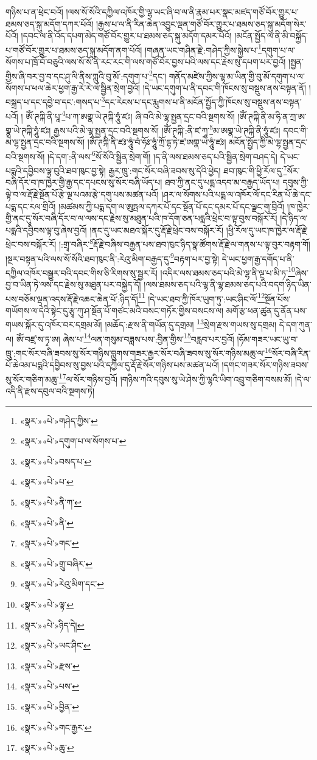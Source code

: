 གཉིས་པ་ན་ཕྲེང་བའོ། །ལས་སོ་སོའི་དཀྱིལ་འཁོར་གྱི་ལྷ་ཡང་ཞི་བ་ལ་ནི་རྣམ་པར་སྣང་མཛད་གཙོ་བོར་གྱུར་པ་ཐམས་ཅད་སྐུ་མདོག་དཀར་པོའོ། །རྒྱས་པ་ལ་ནི་རིན་ཆེན་འབྱུང་ལྡན་གཙོ་བོར་གྱུར་པ་ཐམས་ཅད་སྐུ་མདོག་སེར་པོའོ། །དབང་ལ་ནི་འོད་དཔག་མེད་གཙོ་བོར་གྱུར་པ་ཐམས་ཅད་སྐུ་མདོག་དམར་པོའོ། །མངོན་སྤྱོད་ལ་ནི་མི་བསྐྱོད་པ་གཙོ་བོར་གྱུར་པ་ཐམས་ཅད་སྐུ་མདོག་ནག་པོའོ། །གཞན་ཡང་གཤིན་རྗེ་:གཤེད་ཀྱིས་སྐྱེས་པ་\footnote{«སྣར་»«པེ་»གཤེད་ཀྱིས་}དགུག་པ་ལ་སོགས་པ་ཁྲོ་བོ་བཅུའི་ལས་སོ་སོ་ནི་རང་རང་གི་ལས་གཙོ་བོར་བྱས་པའི་ལས་དང་རྗེས་སུ་དཔག་པར་བྱའོ། །སྤྱན་གྱིས་ཞི་བར་བྱ་བ་དང་ཤུ་ལི་ནིས་ཀླུའི་བུ་མོ་:དགུག་པ་\footnote{«སྣར་»«པེ་»དགུག་པ་ལ་སོགས་པ་}དང་། གནོད་མཛེས་ཀྱིས་ལྷ་མ་ཡིན་གྱི་བུ་མོ་དགུག་པ་ལ་སོགས་པ་ཕལ་ཆེར་ཕྱག་རྒྱ་རེ་རེ་ལ་སྦྱིན་སྲེག་བྱའོ། །དེ་ཡང་དགུག་པ་ནི་དབང་གི་ཁོངས་སུ་བསྡུས་ནས་བསྟན་ནོ། །བསྐྲད་པ་དང་དབྱེ་བ་དང་:གསད་པ་\footnote{«སྣར་»«པེ་»བསད་པ་}དང་རེངས་པ་དང་རྨུགས་པ་ནི་མངོན་སྤྱོད་ཀྱི་ཁོངས་སུ་བསྡུས་ནས་བསྟན་པའོ། །
ཨོཾ་ཊཀྐི་ནི་པཱ་\footnote{«སྣར་»«པེ་»པ་}པ་ཀ་ཨགྣ་ཡེ་ཊཀྐི་ཧཱུཾ་ཛཿ། ཞི་བའི་མེ་ལྷ་སྤྱན་དྲང་བའི་སྔགས་སོ། །ཨོཾ་ཊཀྐི་ནི་མ་ཧི་ན་ཀྲ་ཨ་གྣ་ཡེ་ཊཀྐི་ཧཱུཾ་ཛཿ། རྒྱས་པའི་མེ་ལྷ་སྤྱན་དྲང་བའི་སྔགས་སོ། །ཨོཾ་ཊཀྐི་:ནི་ཛ་ཀཱ་\footnote{«སྣར་»«པེ་»ནི་ཀ་}མ་ཨགྣ་ཡེ་ཊཀྐི་ནི་ཧཱུཾ་ཛཿ། དབང་གི་མེ་ལྷ་སྤྱན་དྲང་བའི་སྔགས་སོ། །ཨོཾ་ཊཀྐི་ནི་ཛཿ་ཧཱུཾ་བཾ་ཧོཿ་ཧཱུཾ་ཀྲོ་དྷ་ཏེ་ཛ་ཨགྣ་ཡེ་ཧཱུཾ་ཛཿ། མངོན་སྤྱོད་ཀྱི་མེ་ལྷ་སྤྱན་དྲང་བའི་སྔགས་སོ། །དེ་དག་:ནི་ལས་\footnote{«སྣར་»«པེ་»ནི་}སོ་སོའི་སྦྱིན་སྲེག་གོ། །ད་ནི་ལས་ཐམས་ཅད་པའི་སྦྱིན་སྲེག་བཤད་དེ། དེ་ཡང་པདྨའི་དབྱིབས་ལྟ་བུའི་ཐབ་ཁུང་བྱ་སྟེ། རྒྱར་ཁྲུ་:གང་སོར་བཞི་ཟབས་སུ་དེའི་ཕྱེད། ཐབ་ཁུང་གི་ཕྱི་རོལ་དུ་\footnote{«སྣར་»«པེ་»གང་}སོར་བཞི་དོར་བ་ཁ་ཁྱེར་གྱི་རྒྱ་དང་དཔངས་སུ་སོར་བཞི་ཡོད་པ། ཐབ་ཀྱི་ནང་དུ་པདྨ་འདབ་མ་བརྒྱད་ཡོད་པ། དབུས་ཀྱི་ལྟེ་བ་ལ་རྡོ་རྗེ་སྔོན་པོ་རྩེ་ལྔ་པའམ་རྩེ་དགུ་པས་མཚན་པའོ། །ཤར་ལ་སོགས་པའི་པདྨ་ལ་འཁོར་ལོ་དང་རིན་པོ་ཆེ་དང་པདྨ་དང་རལ་གྲིའོ། །མཚམས་ཀྱི་པདྨ་དག་ལ་ཨུཏྤལ་དཀར་པོ་དང་སྔོན་པོ་དང་དམར་པོ་དང་ལྗང་གུ་བྲིའོ། །ཁ་ཁྱེར་གྱི་ནང་དུ་སོར་བཞི་དོར་བ་ལ་ལས་དང་རྗེས་སུ་མཐུན་པའི་ཁ་དོག་ཅན་པདྨའི་ཕྲེང་བ་ལྟ་བུས་བསྐོར་རོ། །དེ་ཉིད་ལ་པདྨའི་དབྱིབས་ལྟ་བུ་ཞེས་བྱའོ། །ནང་དུ་ཡང་མཐའ་སྐོར་དུ་རྡོ་རྗེ་ཕྲེང་བས་བསྐོར་རོ། །ཕྱི་རོལ་དུ་ཡང་ཁ་ཁྱེར་ལ་རྡོ་རྗེ་ཕྲེང་བས་བསྐོར་རོ། །:གྲྭ་བཞིར་\footnote{«སྣར་»«པེ་»གྲུ་བཞིར་}རྡོ་རྗེ་བཞིས་བརྒྱན་པས་ཐབ་ཁུང་ཉིད་སྣ་ཚོགས་རྡོ་རྗེ་ལ་གནས་པ་ལྟ་བུར་བརྟག་གོ། །སྔར་བསྟན་པའི་ལས་སོ་སོའི་ཐབ་ཁུང་ནི་:རེའུ་མིག་བརྒྱད་དུ་\footnote{«སྣར་»«པེ་»རེའུ་མིག་དང་}བརྟག་པར་བྱ་སྟེ། དེ་ཡང་ཕྱག་རྒྱ་དགོད་པ་ནི་དཀྱིལ་འཁོར་བསྒྱུར་བའི་དབང་གིས་ཅི་རིགས་སུ་སྦྱར་རོ། །འདིར་ལས་ཐམས་ཅད་པའི་མེ་ལྷ་ནི་ལྔ་པ་མི་ཏ་\footnote{«སྣར་»«པེ་»ལྟ་}ཞེས་བྱ་བ་ཡིན་ཏེ་ལས་དང་རྗེས་སུ་མཐུན་པར་བསྐྱེད་དོ། །ལས་ཐམས་ཅད་པའི་ལྷ་ནི་ལྷ་ཐམས་ཅད་པའི་བདག་ཉིད་ཡིན་པས་བཅོམ་ལྡན་འདས་རྡོ་རྗེ་འཆང་ཆེན་པོ་:ཉིད་དོ།\footnote{«སྣར་»«པེ་»ཉིད་དེ།} །དེ་ཡང་ཐབ་ཀྱི་ཁོར་ཡུག་ཏུ་:ཡང་ཤིང་ལོ་\footnote{«སྣར་»«པེ་»ཡང་ཤིང་}སྔོན་པོས་གཡོགས་ལ་དེའི་སྟེང་དུ་རྩྭ་ཀུ་ཤ་སྔོན་པོ་གཙང་མའི་བསང་གཏོར་གྱིས་བསངས་ལ། མགོ་རྩ་ཕན་ཚུན་དུ་ནོན་པས་གཡས་སྐོར་དུ་འཁོར་བར་དགྲམ་མོ། །མཆོད་:རྫས་ནི་གཡོན་དུ་དགྲམ། \footnote{«སྣར་»«པེ་»རྫས་}སྲེག་རྫས་གཡས་སུ་དགྲམ། དེ་དག་ཀུན་ལ། ཨོཾ་བཛྲ་ས་ཏྭ་ཨ། ཞེས་པ་\footnote{«སྣར་»«པེ་»པས་}ལན་གསུམ་བཟླས་པས་:བྱིན་གྱིས་\footnote{«སྣར་»«པེ་»བྱིན་}བརླབ་པར་བྱའོ། །ཧོམ་གཟར་ཡང་ཡུ་བ་ཁྲུ་:གང་སོར་བཞི་ཟབས་སུ་སོར་གཉིས་བླུགས་གཟར་རྒྱར་སོར་བཞི་ཟབས་སུ་སོར་གཉིས་མཆུ་ལ་\footnote{«སྣར་»«པེ་»གང་རྒྱར་}སོར་བཞི་རིན་པོ་ཆེའམ་པདྨའི་དབྱིབས་སུ་བྱས་པའི་དཀྱིལ་དུ་རྡོ་རྗེ་སོར་གཉིས་པས་མཚན་པའོ། །དགང་གཟར་སོར་གཉིས་ཟབས་སུ་སོར་གཅིག་མཆུ་\footnote{«སྣར་»«པེ་»ཆུ་}ལ་སོར་གཉིས་བྱའོ། །གཉིས་ཀའི་དབུས་སུ་ཡེ་ཤེས་ཀྱི་ལྷའི་ཡིག་འབྲུ་གཅིག་བསམ་མོ། །དེ་ལ་འདི་ནི་རྫས་དབུལ་བའི་སྔགས་ཏེ། 